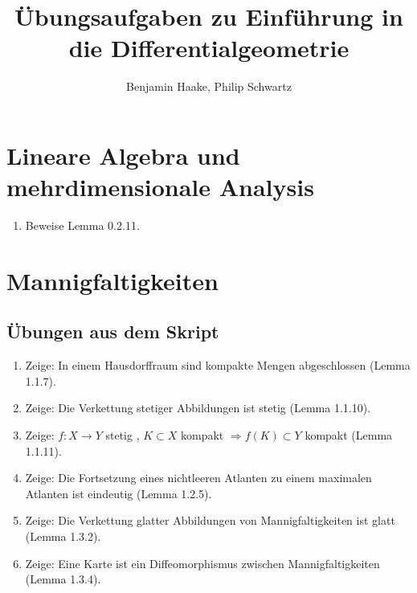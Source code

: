 \documentclass[a4paper]{scrartcl}
\title{Übungsaufgaben zu \glqq Einführung in die Differentialgeometrie\grqq}
\author{Benjamin Haake, Philip Schwartz}
\date{}
\begin{document}
	\maketitle
\setcounter{section}{-1}
	\section{Lineare Algebra und mehrdimensionale Analysis}
	\begin{enumerate}
		\item Beweise Lemma 0.2.11.
	\end{enumerate}

	\section{Mannigfaltigkeiten}
	\subsection{Übungen aus dem Skript}
	\begin{enumerate}
		\item Zeige: In einem Hausdorffraum sind kompakte Mengen abgeschlossen (Lemma 1.1.7).
		\item Zeige: Die Verkettung stetiger Abbildungen ist stetig (Lemma 1.1.10).
		\item Zeige: $f\colon X\rightarrow Y$ stetig , $K\subset X$ kompakt $\Rightarrow f(K)\subset Y$ kompakt (Lemma 1.1.11).
		\item Zeige: Die Fortsetzung eines nichtleeren Atlanten zu einem maximalen Atlanten ist eindeutig (Lemma 1.2.5).
		\item Zeige: Die Verkettung glatter Abbildungen von Mannigfaltigkeiten ist glatt (Lemma 1.3.2).
		\item Zeige: Eine Karte ist ein Diffeomorphismus zwischen Mannigfaltigkeiten (Lemma 1.3.4).
	\end{enumerate}
\end{document}
